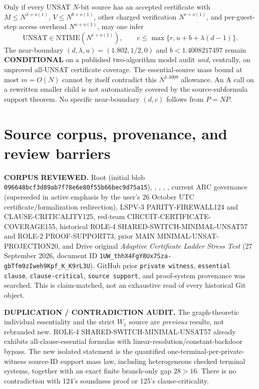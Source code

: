 \documentclass[11pt]{article}
\begin{document}
Only if every UNSAT $N$-bit source has an accepted certificate with $M\le N^{\lambda+o(1)}$, $V\le N^{b+o(1)}$, other charged verification $N^{r+o(1)}$, and per-guest-step access overhead $N^{u+o(1)}$, may one infer
\[
\mathrm{UNSAT}\in\mathrm{NTIME}(N^{c+o(1)}),\qquad
c\le\max\{r,u+b+\lambda(d-1)\}.
\]
The near-boundary $(d,\lambda,u)=(1.802,1/2,0)$ and $b<1.4008217497$ remain \textbf{CONDITIONAL} on a published two-algorithm model audit \emph{and}, centrally, on unproved all-UNSAT certificate coverage. The essential-source mass bound at most $m=O(N)$ cannot by itself contradict this $N^{1.4008}$ allowance. An A call on a rewritten smaller child is not automatically covered by the source-subformula support theorem. No specific near-boundary $(d,c)$ follows from $P=NP$.

\section{Source corpus, provenance, and review barriers}
\textbf{CORPUS REVIEWED.} Root  (initial blob \texttt{096648bcf3d89ab7f78e6e80f55b66bec9d75a15}), , , , , current ARC governance (superseded in active emphasis by the user's 26 October UTC certificate/formalization redirection), LSPV-3 PARITY-FIREWALL124 and CLAUSE-CRITICALITY125, red-team CIRCUIT-CERTIFICATE-COVERAGE155, historical ROLE-4 SHARED-SWITCH-MINIMAL-UNSAT57 and ROLE-2 PROOF-SUPPORT73, prior MAIN MINIMAL-UNSAT-PROJECTION20, and Drive original \emph{Adaptive Certificate Ladder Stress Test} (27 September 2026, document ID \texttt{1UW\_thhX4FgY8Ux7Sza-gbTfm9zIweh9Kpf\_K\_K9rL3U}). GitHub prior \texttt{private witness}, \texttt{essential clause}, \texttt{clause-critical}, \texttt{source support}, and proof-system provenance was searched. This is claim-matched, not an exhaustive read of every historical Git object.

\textbf{DUPLICATION / CONTRADICTION AUDIT.} The graph-theoretic individual essentiality and the strict $W_1$ source are \emph{previous} results, not rebranded new. ROLE-4 SHARED-SWITCH-MINIMAL-UNSAT57 already exhibits all-clause-essential formulas with linear-resolution/constant-backdoor bypass. The new isolated statement is the quantified one-terminal-per-private-witness source-ID support mass law, including heterogeneous checked terminal systems, together with an exact finite branch-only gap $28>16$. There is no contradiction with 124's soundness proof or 125's clause-criticality.
\end{document}

